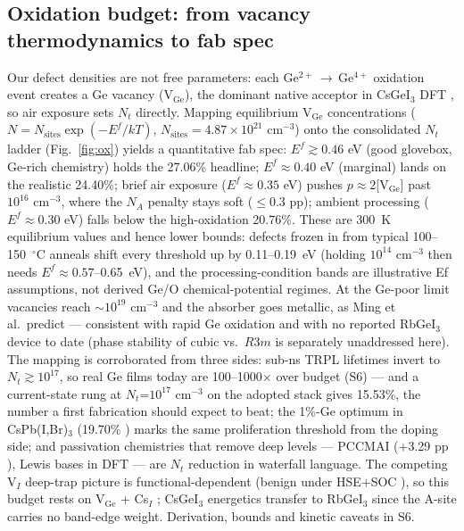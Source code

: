 \documentclass[aip,amsmath,amssymb,preprint]{revtex4-2}
\begin{document}
\subsection{Oxidation budget: from vacancy thermodynamics to fab spec}
Our defect densities are not free parameters: each Ge$^{2+}$\,$\rightarrow$\,Ge$^{4+}$ oxidation event creates a Ge vacancy (V$_{\mathrm{Ge}}$), the dominant native acceptor in CsGeI$_{3}$ DFT \cite{rMing}, so air exposure sets $N_{t}$ directly. Mapping equilibrium V$_{\mathrm{Ge}}$ concentrations ($N=N_{\mathrm{sites}}\exp(-E^f/kT)$, $N_{\mathrm{sites}}=4.87\times10^{21}$ cm$^{-3}$) onto the consolidated $N_{t}$ ladder (Fig.~\ref{fig:ox}) yields a quantitative fab spec: $E^f\gtrsim0.46$ eV (good glovebox, Ge-rich chemistry) holds the 27.06\% headline; $E^f\approx0.40$ eV (marginal) lands on the realistic 24.40\%; brief air exposure ($E^f\approx0.35$ eV) pushes $p\approx2$[V$_{\mathrm{Ge}}$] past $10^{16}$ cm$^{-3}$, where the $N_{A}$ penalty stays soft ($\le$0.3 pp); ambient processing ($E^f\approx0.30$ eV) falls below the high-oxidation 20.76\%. These are 300~K equilibrium values and hence lower bounds: defects frozen in from typical 100--150~$^{\circ}$C anneals shift every threshold up by 0.11--0.19~eV (holding $10^{14}$ cm$^{-3}$ then needs $E^f\approx0.57$--0.65~eV), and the processing-condition bands are illustrative Ef assumptions, not derived Ge/O chemical-potential regimes. At the Ge-poor limit vacancies reach $\sim$$10^{19}$ cm$^{-3}$ and the absorber goes metallic, as Ming et al.\ predict \cite{rMing} --- consistent with rapid Ge oxidation \cite{rThirumal} and with no reported RbGeI$_{3}$ device to date (phase stability of cubic vs.\ $R3m$ is separately unaddressed here). The mapping is corroborated from three sides: sub-ns TRPL lifetimes invert to $N_{t}\gtrsim10^{17}$, so real Ge films today are 100--1000$\times$ over budget \cite{rGeRev} (S6) --- and a current-state rung at $N_{t}$=$10^{17}$ cm$^{-3}$ on the adopted stack gives 15.53\%, the number a first fabrication should expect to beat; the 1\%-Ge optimum in CsPb(I,Br)$_{3}$ (19.70\% \cite{rGeDope}) marks the same proliferation threshold from the doping side; and passivation chemistries that remove deep levels --- PCCMAI (+3.29 pp \cite{rPCCMAI}), Lewis bases in DFT \cite{rKino} --- are $N_{t}$ reduction in waterfall language. The competing V$_{I}$ deep-trap picture is functional-dependent (benign under HSE+SOC \cite{rZhangPRX}), so this budget rests on V$_{\mathrm{Ge}}$ + Cs$_{I}$ \cite{rZhang24}; CsGeI$_{3}$ energetics transfer to RbGeI$_{3}$ since the A-site carries no band-edge weight. Derivation, bounds and kinetic caveats in S6.
\end{document}
